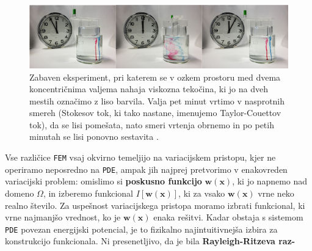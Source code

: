 \begin{figure}[ht]
	\includegraphics[width = 1\textwidth]{Slike/TaylorCouette}
	\caption{Zabaven eksperiment, pri katerem se v ozkem prostoru med dvema koncentričnima valjema nahaja viskozna tekočina, ki jo na dveh mestih označimo z liso barvila. Valja pet minut vrtimo v nasprotnih smereh (Stokesov tok, ki tako nastane, imenujemo Taylor-Couettov tok), da se lisi pomešata, nato smeri vrtenja obrnemo in po petih minutah se lisi ponovno sestavita \cite{Wiki-StokesFlow}.}
	\label{fig:TaylorCouette}
\end{figure}

\parbox{\textwidth}{Vse različice \texttt{FEM} vsaj okvirno temeljijo na variacijskem pristopu, kjer ne operiramo neposredno na \texttt{PDE}, ampak jih najprej pretvorimo v enakovreden variacijski problem: omislimo si \textbf{poskusno funkcijo} $\mathbf{w}(\mathbf{x})$, ki jo napnemo nad domeno $\Omega$, in izberemo funkcional $I[\mathbf{w}(\mathbf{x})]$, ki za vsako $\mathbf{w}(\mathbf{x})$ vrne neko realno število. Za uspešnost variacijskega pristopa moramo izbrati funkcional, ki vrne najmanjšo vrednost, ko je $\mathbf{w}(\mathbf{x})$ enaka rešitvi. Kadar obstaja s sistemom \texttt{PDE} povezan energijski potencial, je to fizikalno najintuitivnejša izbira za konstrukcijo funkcionala. Ni presenetljivo, da je bila \textbf{Rayleigh-Ritzeva raz-} \parfillskip=0pt}

\setlength{\textheight}{26.5cm}
\pagebreak
\setlength{\topmargin}{1.6cm}			%
\setlength{\headheight}{0.0cm}
\setlength{\headsep}{0.0cm}			%
\fancyhf{}
\fancyfoot[C]{\thepage}

